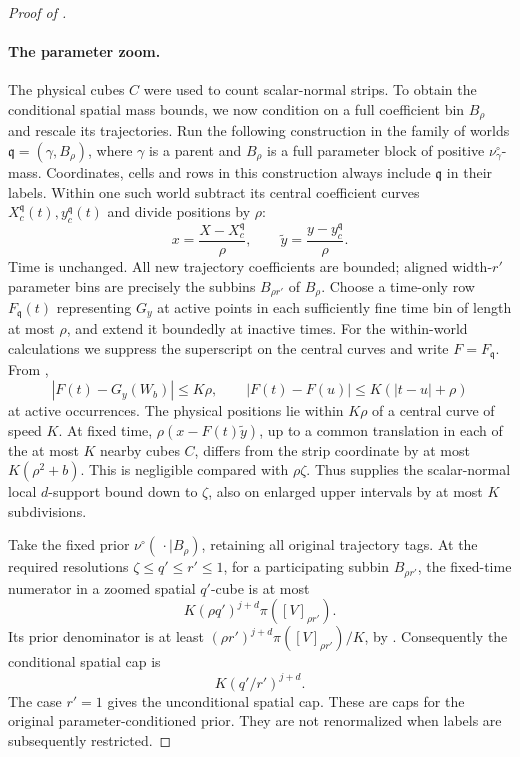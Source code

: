 \begin{proof}[Proof of ]
\paragraph{The parameter zoom.}
The physical cubes \(C\) were used to count scalar-normal strips.
To obtain the conditional spatial mass bounds, we now condition on
a full coefficient bin \(B_\rho\) and rescale its trajectories.
Run the following construction in the family of worlds
\(\mathfrak q=(\gamma,B_\rho)\), where \(\gamma\) is a parent
and \(B_\rho\) is a full parameter block of positive
\(\nu^\circ_\gamma\)-mass. Coordinates, cells and rows in this
construction always include \(\mathfrak q\) in their labels.
Within one such world subtract its central coefficient curves
\(X_c^{\mathfrak q}(t),y_c^{\mathfrak q}(t)\) and divide positions
by \(\rho\):
\[
 x=\frac{X-X_c^{\mathfrak q}}{\rho},\qquad
 \widetilde y=\frac{y-y_c^{\mathfrak q}}{\rho}.
\]
Time is unchanged. All new trajectory coefficients are bounded;
aligned width-\(r'\) parameter bins are precisely the subbins
\(B_{\rho r'}\) of \(B_\rho\).
Choose a time-only row \(F_{\mathfrak q}(t)\) representing
\(G_y\) at active points in each sufficiently fine time bin of
length at most \(\rho\), and extend it boundedly at inactive times.
For the within-world calculations we suppress the superscript on
the central curves and write \(F=F_{\mathfrak q}\).
From ,
\begin{equation}\label{a05:zoom-row}
 |F(t)-G_y(W_b)|\leq K\rho,\qquad
 |F(t)-F(u)|\leq K(|t-u|+\rho)
\end{equation}
at active occurrences. The physical positions lie within \(K\rho\)
of a central curve of speed \(K\).
At fixed time, \(\rho(x-F(t)\widetilde y)\), up to a common
translation in each of the at most \(K\) nearby cubes \(C\),
differs from the strip coordinate by at most \(K(\rho^2+b)\).
This is negligible compared with \(\rho\zeta\).
Thus  supplies the scalar-normal local
\(d\)-support bound down to \(\zeta\), also on enlarged upper
intervals by at most \(K\) subdivisions.

Take the fixed prior \(\nu^\circ(\,\cdot\mid B_\rho)\), retaining
all original trajectory tags. At the required resolutions
\(\zeta\leq q'\leq r'\leq1\), for a participating subbin
\(B_{\rho r'}\), the fixed-time numerator in a zoomed spatial
\(q'\)-cube is at most
\[
 K(\rho q')^{j+d}\pi([V]_{\rho r'}).
\]
Its prior denominator is at least
\((\rho r')^{j+d}\pi([V]_{\rho r'})/K\), by
. Consequently the conditional spatial
cap is
\begin{equation}\label{a05:zoom-conditional-cap}
 K(q'/r')^{j+d}.
\end{equation}
The case \(r'=1\) gives the unconditional spatial cap.
These are caps for the original parameter-conditioned prior.
They are not renormalized when labels are subsequently restricted.


\end{proof}

